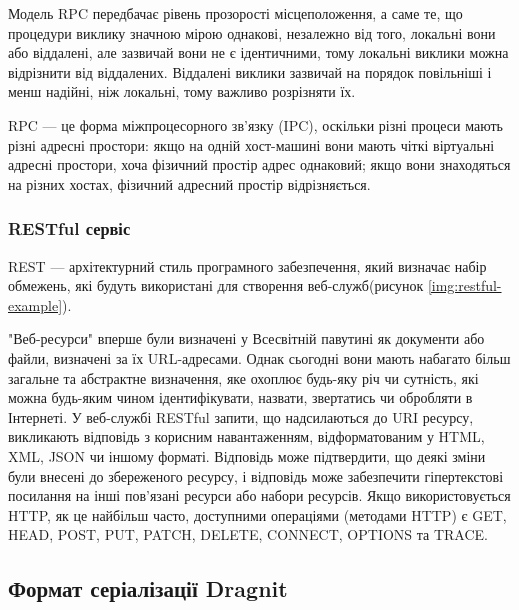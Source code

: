 \documentclass{lib/styles/default-style}
\begin{document}

    Модель RPC передбачає рівень прозорості місцеположення, а саме те,
    що процедури виклику значною мірою однакові, незалежно від того,
    локальні вони або віддалені, але зазвичай вони не є ідентичними,
    тому локальні виклики можна відрізнити від віддалених.
    Віддалені виклики зазвичай на порядок повільніші і менш надійні, ніж локальні, тому важливо розрізняти їх.

    RPC --- це форма міжпроцесорного зв'язку (IPC), оскільки різні процеси
    мають різні адресні простори: якщо на одній хост-машині вони мають чіткі віртуальні
    адресні простори, хоча фізичний простір адрес однаковий; якщо вони знаходяться на різних хостах,
    фізичний адресний простір відрізняється.

    \subsubsection{RESTful сервіс}
    
    REST --- архітектурний стиль програмного забезпечення, який визначає набір обмежень,
    які будуть використані для створення веб-служб(рисунок \ref{img:restful-example}).
    

    "Веб-ресурси" вперше були визначені у Всесвітній павутині як документи або файли, визначені за їх URL-адресами.
    Однак сьогодні вони мають набагато більш загальне та абстрактне визначення, яке охоплює будь-яку річ чи сутність,
    які можна будь-яким чином ідентифікувати, назвати, звертатись чи обробляти в Інтернеті.
    У веб-службі RESTful запити, що надсилаються до URI ресурсу, викликають відповідь з корисним навантаженням,
    відформатованим у HTML, XML, JSON чи іншому форматі. Відповідь може підтвердити, що деякі зміни були внесені
    до збереженого ресурсу, і відповідь може забезпечити гіпертекстові посилання на інші пов'язані ресурси або набори ресурсів.
    Якщо використовується HTTP, як це найбільш часто, доступними операціями (методами HTTP) є GET, HEAD, POST, PUT,
    PATCH, DELETE, CONNECT, OPTIONS та TRACE.



    \subsection{Формат серіалізації Dragnit}
\end{document}
